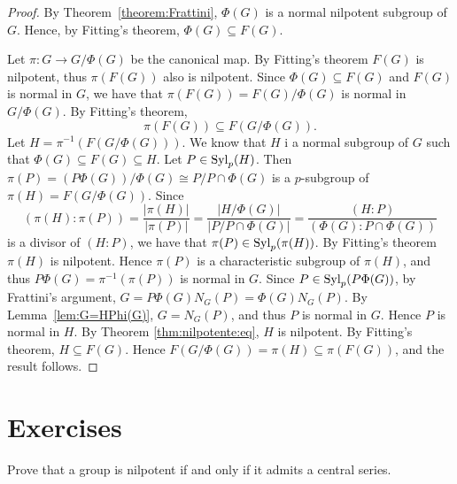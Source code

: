 \begin{proof}
	By Theorem~\ref{theorem:Frattini}, $\Phi(G)$ is a normal nilpotent subgroup of $G$. Hence, by Fitting's theorem,
	$\Phi(G)\subseteq F(G)$.

    Let $\pi\colon G\to G/\Phi(G)$ be the canonical map. By Fitting's theorem $F(G)$ is nilpotent, thus $\pi(F(G))$ also is 
    nilpotent. Since $\Phi(G)\subseteq F(G)$ and $F(G)$ is normal in $G$, we have that $\pi(F(G))=F(G)/\Phi(G)$ 
    is normal in $G/\Phi(G)$. By Fitting's theorem,
	\[
	\pi(F(G))\subseteq F(G/\Phi(G)).
	\]
    Let	$H=\pi^{-1}(F(G/\Phi(G)))$. We know that $H$ i a normal  subgroup
	of $G$ such that $\Phi(G)\subseteq F(G)\subseteq H$. Let $P\in\mathrm{Syl}_p(H)$. Then
	$\pi(P)=(P\Phi(G))/\Phi(G)\cong P/P\cap \Phi(G)$ is a
	$p$-subgroup of $\pi(H)=F(G/\Phi(G))$. Since 
	\[
	(\pi(H):\pi(P))
	=\frac{|\pi(H)|}{|\pi(P)|}
	=\frac{|H/\Phi(G)|}{|P/P\cap \Phi(G)|}
	=\frac{(H:P)}{(\Phi(G):P\cap\Phi(G))}
	\]
	is a divisor of $(H:P)$, we have that $\pi(P)\in \mathrm{Syl}_p(\pi(H))$. By Fitting's theorem $\pi(H)$ is nilpotent.
	Hence $\pi(P)$ is a characteristic subgroup of $\pi(H)$, and thus  $P\Phi(G)=\pi^{-1}(\pi(P))$ is
	normal in $G$. Since $P\in\mathrm{Syl}_p(P\Phi(G))$, by Frattini's argument, $G=P\Phi(G)N_G(P)=\Phi(G)N_G(P)$. By Lemma~\ref{lem:G=HPhi(G)}, $G=N_G(P)$, and thus $P$ is normal in $G$. Hence $P$ is normal in $H$. By Theorem \ref{thm:nilpotente:eq}, $H$ is nilpotent. By Fitting's theorem, $H\subseteq F(G)$. Hence
	$F(G/\Phi(G))=\pi(H)\subseteq \pi(F(G))$, and the result follows.
\end{proof}

%

\section{Exercises}


\begin{prob}
	Prove that a group is nilpotent if and only if it admits a central series.
\end{prob}

